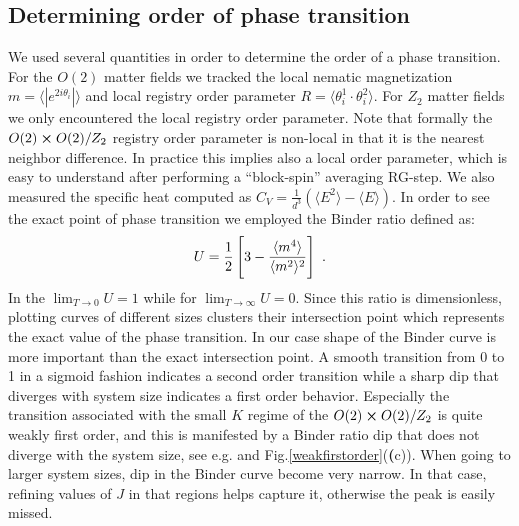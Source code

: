 \subsection{Determining order of phase transition}
\label{binder}
We used several quantities in order to determine the order of a phase transition. For the $O(2)$ matter fields we tracked  the  local nematic magnetization $m=\langle |e^{2i\theta_i}|\rangle$ and local registry order parameter $R=\langle \theta^1_i \cdot \theta^2_i \rangle$. For $Z_2$ matter fields we only encountered the local registry order parameter. Note that formally the $O(2)\cross O(2)/Z_2$ registry order parameter is non-local in that it is the nearest neighbor difference. In practice this implies also a local order parameter, which is easy to understand after performing a ``block-spin'' averaging RG-step. We also measured  the specific heat computed as $C_V = \frac{1}{d^3}(\langle E^2 \rangle -\langle E \rangle)$. In order to see the exact point of phase transition we employed the Binder ratio defined as: 
\begin{equation}
	U = \frac{1}{2} \left[3 - \frac{\langle m^4\rangle}{\langle m^2 \rangle^2}\right] \ .
\end{equation}
In the $\lim_{T \to 0} U = 1$ while for $\lim_{T \to \infty} U = 0$. Since this ratio is dimensionless, plotting curves of different sizes clusters their intersection point which represents the exact value of the phase transition. In our case shape of the Binder curve is more important than the exact intersection point. A smooth transition from 0 to 1 in a sigmoid fashion indicates a second order transition while a sharp dip that diverges with system size indicates a first order behavior. Especially the transition associated with the small $K$ regime of the $O(2) \cross O(2) / Z_2$ is quite weakly first order, and this is manifested by a Binder ratio dip that does not diverge with the system size, see e.g. and Fig.\ref{weakfirstorder}(\textbf(c)). When going to larger system sizes, dip in the Binder curve become very narrow. In that case, refining values of $J$ in that regions helps capture it, otherwise the peak is easily missed.  

